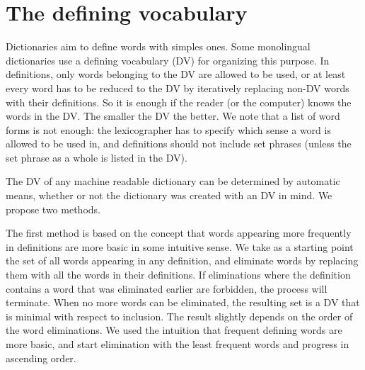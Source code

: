 \documentclass[a4paper,10pt]{article}
\begin{document}
\section{The defining vocabulary}\label{sec_dv}%
Dictionaries aim to define words with simples ones. Some monolingual dictionaries use a defining vocabulary (DV) for organizing this purpose. In definitions, only words belonging to the DV are allowed to be used, or at least every word has to be reduced to the DV by iteratively replacing non-DV words with their definitions. So it is enough if the reader (or the computer) knows the words in the DV. The smaller the DV the better. We note that a list of word forms is not enough: the lexicographer has to specify which sense a word is allowed to be used in, and definitions should not include set phrases (unless the set phrase as a whole is listed in the DV).

The DV of any machine readable dictionary can be determined by automatic means, whether or not the dictionary was created with an DV in mind. We propose two methods.

The first method is based on the concept that words appearing more frequently in definitions are more basic in some intuitive sense. We take as a starting point the set of all words appearing in any definition, and eliminate words by replacing them with all the words in their definitions. If eliminations where the definition contains a word that was eliminated earlier are forbidden, the process will terminate. When no more words can be eliminated, the resulting set is a DV that is minimal with respect to inclusion. The result slightly depends on the order of the word eliminations. We used the intuition that frequent defining words are more basic, and start elimination with the least frequent words and progress in ascending order.
\end{document}
